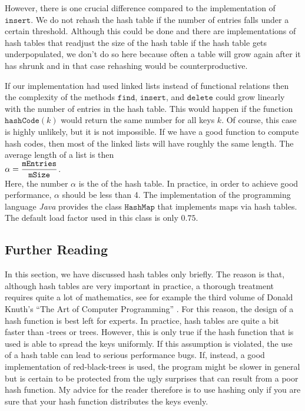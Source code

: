 However, there is one crucial difference compared to the implementation of $\mathtt{insert}$.
We do not rehash the hash table if the number of entries falls under a certain threshold.
Although this could be done and there are implementations of hash tables that readjust the size of the
hash table if the hash table gets underpopulated, we don't do so here because often a table will
grow again after it has shrunk and in that case rehashing would be counterproductive.

If our implementation had used linked lists instead of functional relations then the complexity of
the methods  $\mathtt{find}$, $\mathtt{insert}$, and $\mathtt{delete}$ could grow linearly with the number
of entries in the hash table.  This would happen if the function 
$\mathtt{hashCode}(k)$ would return the same number for all keys $k$.  Of course, this case is
highly unlikely, but it is not impossible.  If we have a good function to compute hash codes, then
most of the linked lists will have roughly the same length.  The average length of a list is then
 \\[0.2cm]
\hspace*{1.3cm}
 $\alpha = \displaystyle \frac{\mathtt{mEntries}}{\mathtt{mSize}}$. 
\\[0.2cm]
Here, the number $\alpha$ is the  of the hash table.  In practice, in order to
achieve good performance, $\alpha$ should be less than 4.  The implementation of the programming
language \textsl{Java} provides the class  $\mathtt{HashMap}$ that implements maps via hash tables.
The default load factor used in this class is only $\mathtt{0.75}$.


\subsection{Further Reading}
In this section, we have discussed hash tables only briefly.  The reason is that, although hash tables are very
important in practice, a thorough treatment requires quite a lot of mathematics, see for example the
third volume of Donald Knuth's ``The Art of Computer Programming'' \cite{knuth:1998b}.  For this
reason, the design of a hash function is best left for experts.  In practice, hash tables are
quite a bit faster than -trees or  trees.  However, this is only true if
the hash function that is used is able to spread the keys uniformly.  If this assumption is
violated, the use of a hash table can lead to serious performance 
bugs.  If, instead, a good
implementation of red-black-trees is used, the program might be slower in general but is certain to
be protected from the ugly surprises that can result from a poor hash function.  My advice for the reader
therefore is to use hashing only if you are sure that your hash function distributes the keys evenly.


